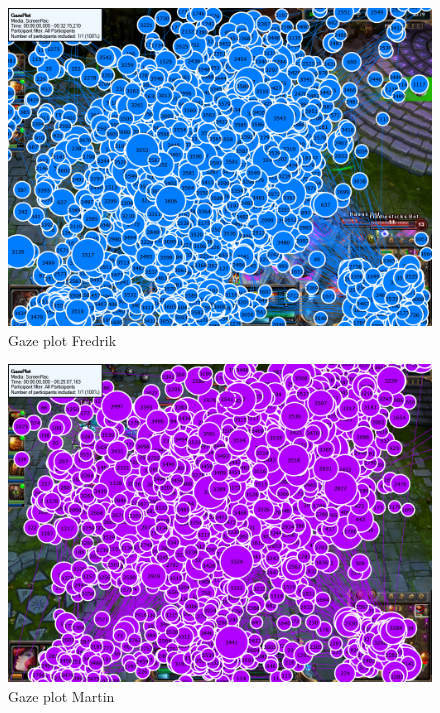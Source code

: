 \documentclass{article}
\begin{document}
\begin{figure}[h!]
\begin{center}
\includegraphics*[width=0.90\columnwidth]{images/gazeplot/Fredrik}
\end{center}
\caption{Gaze plot Fredrik}
\label{gaze_fre}
\end{figure}

\begin{figure}[h!]
\begin{center}
\includegraphics*[width=0.90\columnwidth]{images/gazeplot/Martin}
\end{center}
\caption{Gaze plot Martin}
\label{gaze_mar}
\end{figure}
\end{document}
